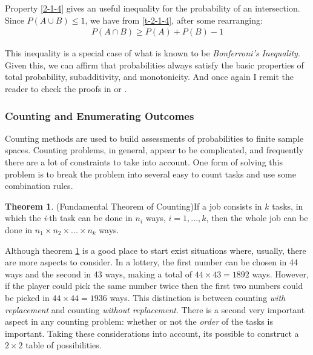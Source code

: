 \documentclass[
  oneside,
  11pt, a4paper,
  footinclude=true,
  headinclude=true,
  cleardoublepage=empty
]{scrbook}
\theoremstyle{definition}
\theoremstyle{definition}
\newtheorem{theorem}{Theorem}[section]
\begin{document}
            Property \ref{2-1-4} gives an useful inequality for the probability of an intersection. Since $P(A \cup B) \leq 1$, we have from \ref{t-2-1-4}, after some rearranging:
            \begin{align}\label{al-6}
                P(A \cap B) \geq P(A) + P(B) - 1
            \end{align}{}
            
            This inequality is a special case of what is known to be \emph{Bonferroni's Inequality}.
            Given this, we can affirm that probabilities always satisfy the basic properties of total probability, subadditivity, and monotonicity. And once again I remit the reader to check the proofs in \cite{CaseBerg:01} or \cite{RePEc:bes:amstat:v:59:y:2005:m:august:p:276-276}.
            
        \subsubsection{Counting and Enumerating Outcomes}
        
        Counting methods are used to build assessments of probabilities to finite sample spaces. Counting problems, in general, appear to be complicated, and frequently there are a lot of constraints to take into account. One form of solving this problem is to break the problem into several easy to count tasks and use some combination rules.
        
        \begin{theorem}{(Fundamental Theorem of Counting)}\label{t-2-1-5}
            If a job consists in $k$ tasks, in which the \emph{i}-th task can be done in $n_i$ ways, $i = 1,...,k$, then the whole job can be done in $n_1 \times n_2 \times ... \times n_k$ ways.
        \end{theorem}{}
        
        Although theorem \ref{t-2-1-5} is a good place to start exist situations where, usually, there are more aspects to consider. In a lottery, the first number can be chosen in 44 ways and the second in 43 ways, making a total of $44 \times 43 = 1892$ ways. However, if the player could pick the same number twice then the first two numbers could be picked in $44 \times 44 = 1936$ ways. This distinction is between counting \emph{with replacement} and counting \emph{without replacement}. There is a second very important aspect in any counting problem: whether or not the \emph{order} of the tasks is important. Taking these considerations into account, its possible to construct a $2 \times 2$ table of possibilities.
        
\end{document}
